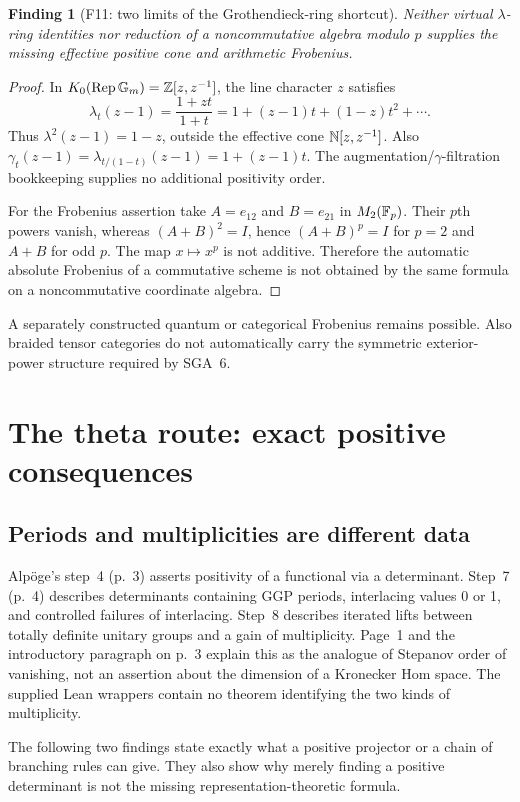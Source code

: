 \documentclass[11pt,a4paper]{article}
\newcommand{\fid}[1]{\textsf{#1}}\newcommand{\gate}[1]{\textsf{#1}}
\theoremstyle{named}\newtheorem{finding}{Finding}[section]
\theoremstyle{definition}\newtheorem{definition}[finding]{Definition}
\theoremstyle{remark}\newtheorem{remark}[finding]{Remark}
\begin{document}
\begin{finding}[\fid{F11}: two limits of the Grothendieck-ring shortcut]\label{f:lambda}
Neither virtual $\lambda$-ring identities nor reduction of a noncommutative algebra modulo $p$ supplies the missing effective positive cone and arithmetic Frobenius.
\end{finding}
\begin{proof}
In $K_0(\operatorname{Rep}\mathbb G_m)=\mathbb Z[z,z^{-1}]$, the line character $z$ satisfies
\[
 \lambda_t(z-1)=\frac{1+zt}{1+t}
 =1+(z-1)t+(1-z)t^2+\cdots.
\]
Thus $\lambda^2(z-1)=1-z$, outside the effective cone $\mathbb N[z,z^{-1}]$. Also
$\gamma_t(z-1)=\lambda_{t/(1-t)}(z-1)=1+(z-1)t$. The augmentation/\(\gamma\)-filtration bookkeeping supplies no additional positivity order.

For the Frobenius assertion take $A=e_{12}$ and $B=e_{21}$ in $M_2(\mathbb F_p)$. Their $p$th powers vanish, whereas $(A+B)^2=I$, hence $(A+B)^p=I$ for $p=2$ and $A+B$ for odd $p$. The map $x\mapsto x^p$ is not additive. Therefore the automatic absolute Frobenius of a commutative scheme is not obtained by the same formula on a noncommutative coordinate algebra.
\end{proof}
A separately constructed quantum or categorical Frobenius remains possible. Also braided tensor categories do not automatically carry the symmetric exterior-power structure required by SGA~6.

\section{The theta route: exact positive consequences}\label{sec:theta}
\subsection{Periods and multiplicities are different data}
Alp\"oge's step~4 (p.~3) asserts positivity of a functional via a determinant. Step~7 (p.~4) describes determinants containing GGP periods, interlacing values 0 or 1, and controlled failures of interlacing. Step~8 describes iterated lifts between totally definite unitary groups and a gain of multiplicity. Page~1 and the introductory paragraph on p.~3 explain this as the analogue of Stepanov order of vanishing, not an assertion about the dimension of a Kronecker Hom space. The supplied Lean wrappers contain no theorem identifying the two kinds of multiplicity.

The following two findings state exactly what a positive projector or a chain of branching rules can give. They also show why merely finding a positive determinant is not the missing representation-theoretic formula.
\end{document}
